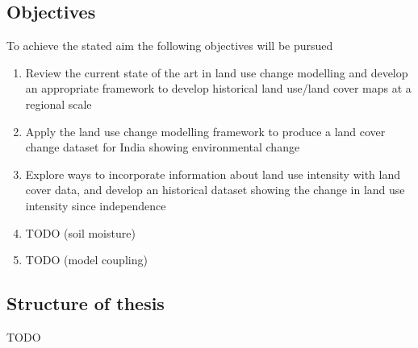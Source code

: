 \documentclass{icldt}\usepackage[]{graphicx}\usepackage[]{color}
\begin{document}
\subsection{Objectives}
To achieve the stated aim the following objectives will be pursued

\begin{enumerate}
  \item Review the current state of the art in land use change modelling and develop an appropriate framework to develop historical land use/land cover maps at a regional scale
  \item Apply the land use change modelling framework to produce a land cover change dataset for India showing environmental change  
  \item Explore ways to incorporate information about land use intensity with land cover data, and develop an historical dataset showing the change in land use intensity since independence
  \item TODO (soil moisture)
  \item TODO (model coupling)
\end {enumerate}

\subsection{Structure of thesis}
TODO



\end{document}
